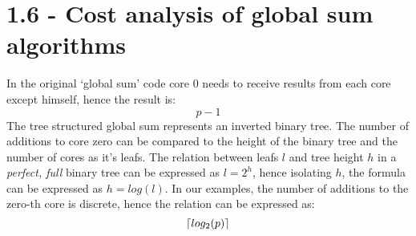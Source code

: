 \documentclass[a4paper,11pt,twoside]{article}
\DeclarePairedDelimiter{\ceil}{\lceil}{\rceil}
\begin{document}
\section{1.6 - Cost analysis of global sum algorithms}
In the original `global sum' code core 0 needs to receive results from each core except himself, hence the result is:
\begin{equation*}
p-1
\end{equation*}
The tree structured global sum represents an inverted binary tree. The number of additions to core zero can be compared to the height of the binary tree and the number of cores as it's leafs. The relation between leafs $l$ and tree height $h$ in a \textit{perfect, full} binary tree can be expressed as $l = 2^{h}$, hence isolating $h$, the formula can be expressed as $h=log(l)$. In our examples, the number of additions to the zero-th core is discrete, hence the relation can be expressed as:
\begin{equation*}
\ceil*{log_{2}(p)}
\end{equation*}


\end{document}

